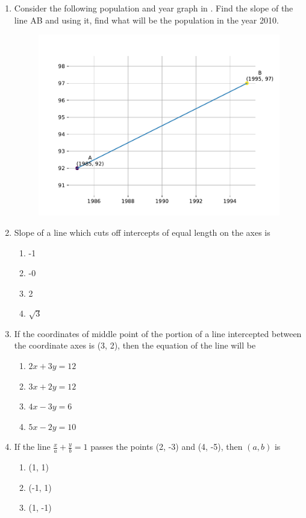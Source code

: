 \begin{enumerate}[label=\thesubsection.\arabic*, ref=\thesubsection.\theenumi]
\item Consider the following population and year graph
in .
	Find the slope of the line AB and using it,  find what will be the population in the year 2010.
\\
\begin{figure}[H]
\centering
\includegraphics[width=0.75\columnwidth]{chapters/11/10/1/14/figs/fig.pdf}
\caption{}
\label{fig:chapters/11/10/1/14/1}
\end{figure}
\solution

\item Slope of a line which cuts off intercepts of equal length on the axes is 
\begin{enumerate}
\item -1
\item -0
\item 2
\item $\sqrt{3}$
\end{enumerate}
\item If the coordinates of middle point of the portion of a line intercepted between the coordinate axes is (3, 2), then the equation of the line will be
\begin{enumerate}
\item $2x+3y=12$
\item $3x+2y=12$
\item $4x-3y=6$
\item $5x-2y=10$
\end{enumerate}
\item If the line $\frac{x}{a}+\frac{y}{b}=1$ passes the points (2, -3) and (4, -5),  then $(a, b)$ is 
\begin{enumerate}
\item (1, 1)
\item (-1, 1)
\item (1, -1)

\end{enumerate}
\end{enumerate}
